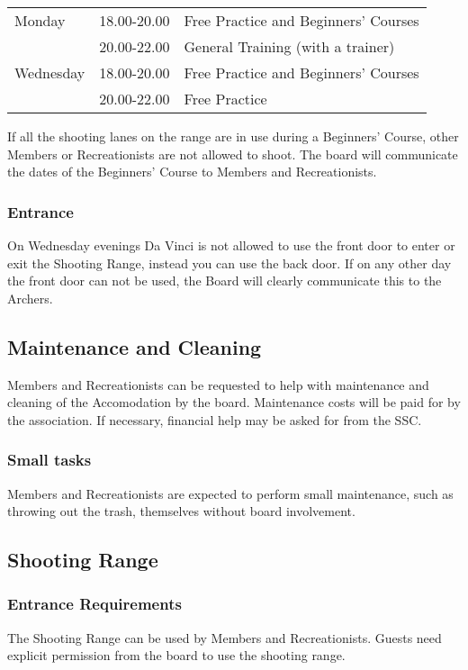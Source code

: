 \documentclass[a4paper]{article}
\begin{document}
\begin{tabular}{lll}
Monday    & 18.00-20.00 & Free Practice  and Beginners’ Courses \\
          & 20.00-22.00 & General Training (with a trainer)     \\
Wednesday & 18.00-20.00 & Free Practice and Beginners' Courses  \\
          & 20.00-22.00 & Free Practice                        
\end{tabular}

\bigskip

If all the shooting lanes on the range are in use during a Beginners’ Course, other Members or Recreationists are not allowed to shoot. The board will communicate the dates of the Beginners’ Course to Members and Recreationists.

\subsubsection{Entrance}
On Wednesday evenings Da Vinci is not allowed to use the front door to enter or exit the Shooting Range, instead you can use the back door. If on any other day the front door can not be used, the Board will clearly communicate this to the Archers. 

\subsection{Maintenance and Cleaning}
Members and Recreationists can be requested to help with maintenance and cleaning of the Accomodation by the board. Maintenance costs will be paid for by the association. If necessary, financial help may be asked for from the SSC.

\subsubsection{Small tasks}
Members and Recreationists are expected to perform small maintenance, such as throwing out the trash, themselves without board involvement.

\subsection{Shooting Range}
\subsubsection{Entrance Requirements}
The Shooting Range can be used by Members and Recreationists. Guests need explicit permission from the board to use the shooting range. 
\end{document}
